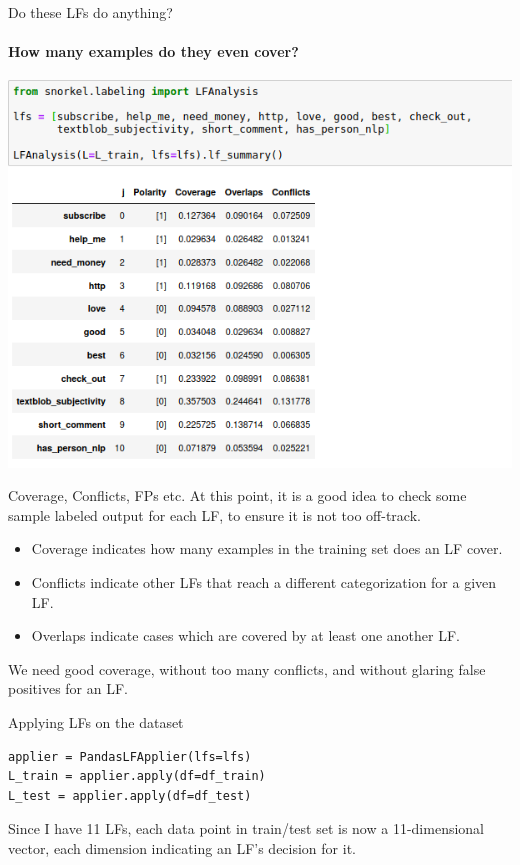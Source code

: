 \documentclass{beamer}
\begin{document}
\begin{frame}[fragile]{Do these LFs do anything?}
\framesubtitle{How many examples do they even cover?}
\includegraphics[width=\textwidth]{figures/lfanalysis.png}
\end{frame}

\begin{frame}{Coverage, Conflicts, FPs etc.}
At this point, it is a good idea to check some sample labeled output for each LF, to ensure it is not too off-track. 
    \begin{itemize}
        \item Coverage indicates how many examples in the training set does an LF cover.
        \item Conflicts indicate other LFs that reach a different categorization for a given LF.
        \item Overlaps indicate cases which are covered by at least one another LF. 
    \end{itemize}
We need good coverage, without too many conflicts, and without glaring false positives for an LF.
\end{frame}

\begin{frame}[fragile]{Applying LFs on the dataset}
\small
\begin{verbatim}
applier = PandasLFApplier(lfs=lfs)
L_train = applier.apply(df=df_train)
L_test = applier.apply(df=df_test)
\end{verbatim}
Since I have 11 LFs, each data point in train/test set is now a 11-dimensional vector, each dimension indicating an LF's decision for it. 
\end{frame}
\end{document}
